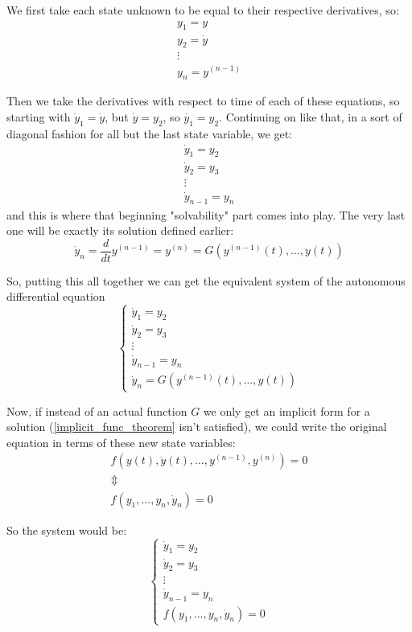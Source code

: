 We first take each state unknown to be equal to their respective derivatives, so:
\begin{gather*}
	y_1 = y     \\
	y_2 = \dot{y} \\
	\vdots \\
	y_n = y^{(n-1)}
\end{gather*}

Then we take the derivatives with respect to time of each of these equations, so starting with $\dot{y}_1 = \dot{y}$, but $\dot{y} = y_2$, so $\dot{y_1}=y_2$. Continuing on like that, in a sort of diagonal fashion for all but the last state variable, we get:
\begin{gather*}
	\dot{y}_1 = y_2 \\
	\dot{y}_2 = y_3 \\
	\vdots \\
	\dot{y}_{n-1} = y_n
\end{gather*}
and this is where that beginning "solvability" part comes into play. The very last one will be exactly its solution defined earlier:
\[
	\dot{y}_n = \frac{d}{dt}y^{(n-1)} = y^{(n)}  = G(y^{(n-1)}(t), \dots, y(t))
\]

So, putting this all together we can get the equivalent system of the autonomous differential equation
\[
	\begin{cases}
		\dot{y}_1 = y_2     \\
		\dot{y}_2 = y_3     \\
		\vdots              \\
		\dot{y}_{n-1} = y_n \\
		\dot{y}_n  = G(y^{(n-1)}(t), \dots, y(t))
	\end{cases}
\]

Now, if instead of an actual function $G$ we only get an implicit form for a solution (\ref{implicit_func_theorem} isn't satisfied), we could write the original equation in terms of these new state variables:
\begin{gather*}
	f(y(t), \dot{y}(t),\dots,y^{(n-1)},y^{(n)})= 0 \\
	\Updownarrow \\
	f(y_1,\dots,y_n,\dot{y}_n) = 0
\end{gather*}

So the system would be:
\[
	\begin{cases}
		\dot{y}_1 = y_2     \\
		\dot{y}_2 = y_3     \\
		\vdots              \\
		\dot{y}_{n-1} = y_n \\
		f(y_1,\dots,y_n,\dot{y}_n) = 0
	\end{cases}
\]

